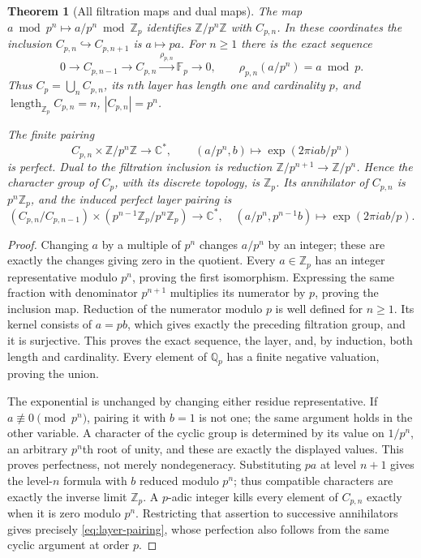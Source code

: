 \documentclass[11pt,a4paper]{article}
\newtheorem{theorem}{Theorem}[section]
\theoremstyle{definition}\newtheorem{definition}[theorem]{Definition}
\providecommand{\length}{\operatorname{length}}
\begin{document}
\begin{theorem}[All filtration maps and dual maps]
\label{thm:prime-filtration}
The map $a\bmod p^n\mapsto a/p^n\bmod\mathbb Z_p$ identifies
$\mathbb Z/p^n\mathbb Z$ with $C_{p,n}$. In these coordinates the
inclusion $C_{p,n}\hookrightarrow C_{p,n+1}$ is $a\mapsto pa$.
For $n\ge1$ there is the exact sequence
\[
 0\longrightarrow C_{p,n-1}\longrightarrow C_{p,n}
 \xrightarrow{\rho_{p,n}}\mathbb F_p\longrightarrow0,
 \qquad \rho_{p,n}(a/p^n)=a\bmod p.
 \tag{RP28}\label{eq:graded-sequence}
\]
Thus $C_p=\bigcup_n C_{p,n}$, its $n$th layer has length one and
cardinality $p$, and $\length_{\mathbb Z_p}C_{p,n}=n$,
$|C_{p,n}|=p^n$.

The finite pairing
\[
 C_{p,n}\times\mathbb Z/p^n\mathbb Z\longrightarrow\mathbb C^*,
 \qquad (a/p^n,b)\longmapsto\exp(2\pi i ab/p^n)
 \tag{RP29}\label{eq:finite-prime-pairing}
\]
is perfect. Dual to the filtration inclusion is reduction
$\mathbb Z/p^{n+1}\to\mathbb Z/p^n$. Hence the character group of
$C_p$, with its discrete topology, is $\mathbb Z_p$. Its annihilator
of $C_{p,n}$ is $p^n\mathbb Z_p$, and the induced perfect layer pairing
is
\[
 (C_{p,n}/C_{p,n-1})\times
 (p^{n-1}\mathbb Z_p/p^n\mathbb Z_p)\longrightarrow\mathbb C^*,
 \quad (a/p^n,p^{n-1}b)\longmapsto\exp(2\pi i ab/p).
 \tag{RP30}\label{eq:layer-pairing}
\]
\end{theorem}
\begin{proof}
Changing $a$ by a multiple of $p^n$ changes $a/p^n$ by an integer;
these are exactly the changes giving zero in the quotient. Every
$a\in\mathbb Z_p$ has an integer representative modulo $p^n$, proving
the first isomorphism. Expressing the same fraction with denominator
$p^{n+1}$ multiplies its numerator by $p$, proving the inclusion map.
Reduction of the numerator modulo $p$ is well defined for $n\ge1$.
Its kernel consists of $a=pb$, which gives exactly the preceding
filtration group, and it is surjective. This proves the exact sequence,
the layer, and, by induction, both length and cardinality. Every element
of $\mathbb Q_p$ has a finite negative valuation, proving the union.

The exponential is unchanged by changing either residue representative.
If $a\not\equiv0\pmod{p^n}$, pairing it with $b=1$ is not one; the
same argument holds in the other variable. A character of the cyclic
group is determined by its value on $1/p^n$, an arbitrary $p^n$th
root of unity, and these are exactly the displayed values. This proves
perfectness, not merely nondegeneracy. Substituting $pa$ at level $n+1$
gives the level-$n$ formula with $b$ reduced modulo $p^n$; thus compatible
characters are exactly the inverse limit $\mathbb Z_p$. A $p$-adic
integer kills every element of $C_{p,n}$ exactly when it is zero
modulo $p^n$. Restricting that assertion to successive annihilators
gives precisely \eqref{eq:layer-pairing}, whose perfection also follows
from the same cyclic argument at order $p$.
\end{proof}
\end{document}
